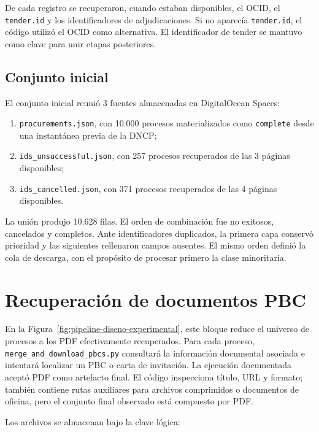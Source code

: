 De cada registro se recuperaron, cuando estaban disponibles, el OCID, el \texttt{tender.id} y los identificadores de adjudicaciones. Si no aparecía \texttt{tender.id}, el código utilizó el OCID como alternativa. El identificador de tender se mantuvo como clave para unir etapas posteriores.

\subsection{Conjunto inicial}

El conjunto inicial reunió 3 fuentes almacenadas en DigitalOcean Spaces:

\begin{enumerate}
  \item \texttt{procurements.json}, con 10.000 procesos materializados como \texttt{complete} desde una instantánea previa de la DNCP;
  \item \texttt{ids\_unsuccessful.json}, con 257 procesos recuperados de las 3 páginas disponibles;
  \item \texttt{ids\_cancelled.json}, con 371 procesos recuperados de las 4 páginas disponibles.
\end{enumerate}

La unión produjo 10.628 filas. El orden de combinación fue no exitosos, cancelados y completos. Ante identificadores duplicados, la primera capa conservó prioridad y las siguientes rellenaron campos ausentes. El mismo orden definió la cola de descarga, con el propósito de procesar primero la clase minoritaria.



\section{Recuperación de documentos PBC}
\label{sec:recuperacion_pbc}

En la Figura~\ref{fig:pipeline-diseno-experimental}, este bloque reduce el universo de procesos a los PDF efectivamente recuperados. Para cada proceso, \texttt{merge\_and\_download\_pbcs.py} consultará la información documental asociada e intentará localizar un PBC o carta de invitación. La ejecución documentada aceptó PDF como artefacto final. El código inspecciona título, URL y formato; también contiene rutas auxiliares para archivos comprimidos o documentos de oficina, pero el conjunto final observado está compuesto por PDF.

Los archivos se almacenan bajo la clave lógica:

